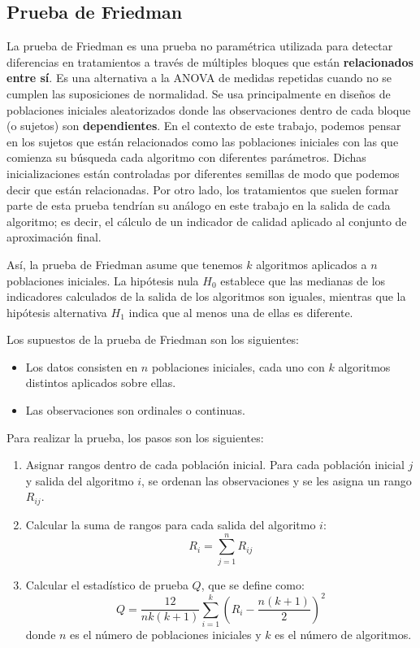 \subsection{Prueba de Friedman} \label{sec:Friedman}

La prueba de Friedman \cite{hollanderNonparametricStatisticalMethods2015} es una prueba no paramétrica utilizada para detectar diferencias en tratamientos a través de múltiples bloques que están \textbf{relacionados entre sí}. Es una alternativa a la ANOVA de medidas repetidas cuando no se cumplen las suposiciones de normalidad. Se usa principalmente en diseños de poblaciones iniciales aleatorizados donde las observaciones dentro de cada bloque (o sujetos) son \textbf{dependientes}. En el contexto de este trabajo, podemos pensar en los sujetos que están relacionados como las poblaciones iniciales con las que comienza su búsqueda cada algoritmo con diferentes parámetros. Dichas inicializaciones están controladas por diferentes semillas de modo que podemos decir que están relacionadas. Por otro lado, los tratamientos que suelen formar parte de esta prueba tendrían su análogo en este trabajo en la salida de cada algoritmo; es decir, el cálculo de un indicador de calidad aplicado al conjunto de aproximación final.  

Así, la prueba de Friedman asume que tenemos \( k \) algoritmos aplicados a \( n \) poblaciones iniciales. La hipótesis nula \( H_0 \) establece que las medianas de los indicadores calculados de la salida de los algoritmos son iguales, mientras que la hipótesis alternativa \( H_1 \) indica que al menos una de ellas es diferente.

Los supuestos de la prueba de Friedman son los siguientes:
\begin{itemize}
    \item Los datos consisten en \( n \) poblaciones iniciales, cada uno con \( k \) algoritmos distintos aplicados sobre ellas.
    \item Las observaciones son ordinales o continuas.
\end{itemize}

Para realizar la prueba, los pasos son los siguientes:

\begin{enumerate}
    \item Asignar rangos dentro de cada población inicial. Para cada población inicial \( j \) y salida del algoritmo \( i \), se ordenan las observaciones y se les asigna un rango \( R_{ij} \).
    \item Calcular la suma de rangos para cada salida del algoritmo \( i \):
    \[
        R_i = \sum_{j=1}^{n} R_{ij}
        \]
\item Calcular el estadístico de prueba \( Q \), que se define como:
        \[
            Q = \frac{12}{nk(k+1)} \sum_{i=1}^{k} \left( R_i - \frac{n(k+1)}{2} \right)^2
            \]
            donde \( n \) es el número de poblaciones iniciales y \( k \) es el número de algoritmos.
        \end{enumerate}

